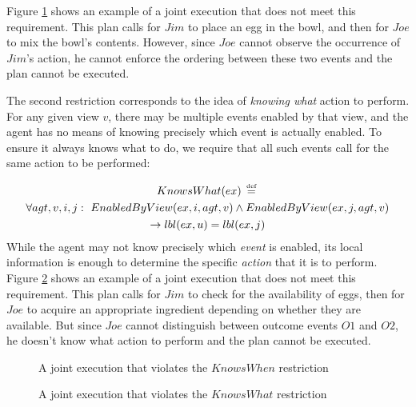 Figure \ref{fig:not-knows-when} shows an example of a joint execution
that does not meet this requirement. This plan calls for $Jim$ to
place an egg in the bowl, and then for $Joe$ to mix the bowl's contents.
However, since $Joe$ cannot observe the occurrence of $Jim$'s action,
he cannot enforce the ordering between these two events and the plan
cannot be executed.

The second restriction corresponds to the idea of \emph{knowing what}
action to perform. For any given view $v$, there may be multiple
events enabled by that view, and the agent has no means of knowing
precisely which event is actually enabled. To ensure it always knows
what to do, we require that all such events call for the same action
to be performed:

\begin{multline*}
KnowsWhat(ex)\,\stackrel{\mbox{\tiny def}}{=}\,\\
\forall agt,v,i,j:\,\, EnabledByView(ex,i,agt,v)\wedge EnabledByView(ex,j,agt,v)\\
\rightarrow lbl(ex,u)=lbl(ex,j)\end{multline*}
 While the agent may not know precisely which \emph{event} is enabled,
its local information is enough to determine the specific \emph{action}
that it is to perform. Figure \ref{fig:not-knows-what} shows an example
of a joint execution that does not meet this requirement. This plan
calls for $Jim$ to check for the availability of eggs, then for $Joe$
to acquire an appropriate ingredient depending on whether they are
available. But since $Joe$ cannot distinguish between outcome events
$O1$ and $O2$, he doesn't know what action to perform and the plan
cannot be executed.

%
\begin{figure}[!t]

\caption{A joint execution that violates the $KnowsWhen$ restriction}


\label{fig:not-knows-when} 
\end{figure}


%
\begin{figure}[!t]

\caption{A joint execution that violates the $KnowsWhat$ restriction}


\label{fig:not-knows-what} 
\end{figure}


